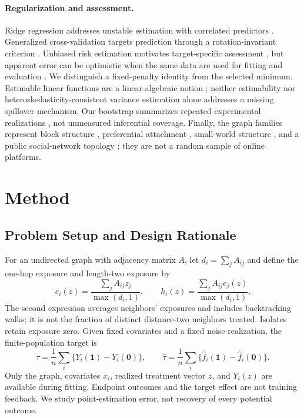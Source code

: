 \documentclass{article}
\newcommand{\gate}{\tau}
\begin{document}
\paragraph{Regularization and assessment.}
Ridge regression addresses unstable estimation with correlated predictors \citep{Hoerl1970}. Generalized cross-validation targets prediction through a rotation-invariant criterion \citep{Golub1979}. Unbiased risk estimation motivates target-specific assessment \citep{Stein1981}, but apparent error can be optimistic when the same data are used for fitting and evaluation \citep{Efron1986}. We distinguish a fixed-penalty identity from the selected minimum. Estimable linear functions are a linear-algebraic notion \citep{Searle1965}; neither estimability nor heteroskedasticity-consistent variance estimation \citep{White1980} alone addresses a missing spillover mechanism. Our bootstrap summarizes repeated experimental realizations \citep{Efron1979}, not unmeasured inferential coverage. Finally, the graph families represent block structure \citep{Choi2012}, preferential attachment \citep{Barabasi1999}, small-world structure \citep{Watts1998}, and a public social-network topology \citep{Traud2012,Rossi2015}; they are not a random sample of online platforms.

\section{Method}
\subsection{Problem Setup and Design Rationale}
For an undirected graph with adjacency matrix $A$, let $d_i=\sum_j A_{ij}$ and define the one-hop exposure and length-two exposure by
\begin{equation}
e_i(z)=\frac{\sum_j A_{ij}z_j}{\max(d_i,1)},\qquad
h_i(z)=\frac{\sum_j A_{ij}e_j(z)}{\max(d_i,1)}.
\label{eq:exposure}
\end{equation}
The second expression averages neighbors' exposures and includes backtracking walks; it is not the fraction of distinct distance-two neighbors treated. Isolates retain exposure zero. Given fixed covariates and a fixed noise realization, the finite-population target is
\begin{equation}
\gate=\frac{1}{n}\sum_i\{Y_i(\mathbf{1})-Y_i(\mathbf{0})\},\qquad
\widehat\gate=\frac{1}{n}\sum_i\{\widehat f_i(\mathbf{1})-\widehat f_i(\mathbf{0})\}.
\label{eq:target}
\end{equation}
Only the graph, covariates $x_i$, realized treatment vector $z$, and $Y_i(z)$ are available during fitting. Endpoint outcomes and the target effect are not training feedback. We study point-estimation error, not recovery of every potential outcome.
\end{document}
